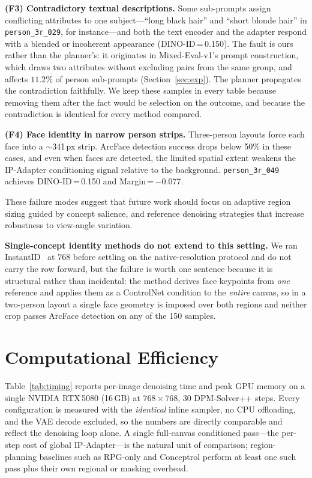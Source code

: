 \documentclass[review,10pt,times]{elsarticle}
\begin{document}
\noindent\textbf{(F3) Contradictory textual descriptions.}
Some sub-prompts assign conflicting attributes to one subject---``long black
hair'' and ``short blonde hair'' in \texttt{person\_3r\_029}, for
instance---and both the text encoder and the adapter respond with a blended
or incoherent appearance (DINO-ID\,=\,0.150).  The fault is ours rather than
the planner's: it originates in Mixed-Eval-v1's prompt construction, which
draws two attributes without excluding pairs from the same group, and affects
$11.2\%$ of person sub-prompts (Section~\ref{sec:exp}).  The planner
propagates the contradiction faithfully.  We keep these samples in every
table because removing them after the fact would be selection on the outcome,
and because the contradiction is identical for every method compared.

\noindent\textbf{(F4) Face identity in narrow person strips.}
Three-person layouts force each face into a $\sim$341\,px strip.
ArcFace detection success drops below 50\% in these cases, and even
when faces are detected, the limited spatial extent weakens the
IP-Adapter conditioning signal relative to the background.
\texttt{person\_3r\_049} achieves DINO-ID\,=\,0.150 and
Margin\,=\,$-$0.077.

These failure modes suggest that future work should focus on
adaptive region sizing guided by concept salience, and reference
denoising strategies that increase robustness to view-angle variation.

\noindent\textbf{Single-concept identity methods do not extend to this
setting.}
We ran InstantID~\cite{wang2024instantid} at $768$ before settling on the
native-resolution protocol and do not carry the row forward, but the failure
is worth one sentence because it is structural rather than incidental: the
method derives face keypoints from \emph{one} reference and applies them as a
ControlNet condition to the \emph{entire} canvas, so in a two-person layout a
single face geometry is imposed over both regions and neither crop passes
ArcFace detection on any of the 150 samples.


\section{Computational Efficiency}
\label{sec:efficiency}

Table~\ref{tab:timing} reports per-image denoising time and peak GPU
memory on a single NVIDIA RTX\,5080 (16\,GB) at $768\!\times\!768$, 30
DPM-Solver++ steps.  Every configuration is measured with the
\emph{identical} inline sampler, no CPU offloading, and the VAE decode
excluded, so the numbers are directly comparable and reflect the
denoising loop alone.  A single full-canvas conditioned pass---the
per-step cost of global IP-Adapter---is the natural unit of comparison;
region-planning baselines such as RPG-only and Conceptrol perform at
least one such pass plus their own regional or masking overhead.
\end{document}

